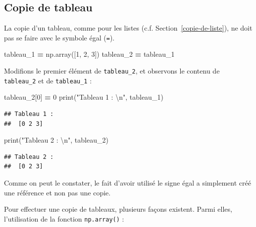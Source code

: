 \documentclass[12pt,]{book}
\newenvironment{Shaded}{\begin{snugshade}}{\end{snugshade}}
\newcommand{\DecValTok}[1]{\textcolor[rgb]{0.00,0.00,0.81}{#1}}
\newcommand{\CharTok}[1]{\textcolor[rgb]{0.31,0.60,0.02}{#1}}
\newcommand{\StringTok}[1]{\textcolor[rgb]{0.31,0.60,0.02}{#1}}
\newcommand{\OperatorTok}[1]{\textcolor[rgb]{0.81,0.36,0.00}{\textbf{#1}}}
\newcommand{\BuiltInTok}[1]{#1}
\newcommand{\NormalTok}[1]{#1}
\numberwithin{equation}{section}
\numberwithin{countremarque}{section}
\begin{document}
\subsection{Copie de tableau}\label{copie-de-tableau}

La copie d'un tableau, comme pour les listes (c.f.
Section~\ref{copie-de-liste}), ne doit pas se faire avec le symbole égal
(\texttt{=}).

\begin{Shaded}
\begin{Highlighting}[]
\NormalTok{tableau_1 }\OperatorTok{=}\NormalTok{ np.array([}\DecValTok{1}\NormalTok{, }\DecValTok{2}\NormalTok{, }\DecValTok{3}\NormalTok{])}
\NormalTok{tableau_2 }\OperatorTok{=}\NormalTok{ tableau_1}
\end{Highlighting}
\end{Shaded}

Modifions le premier élément de \texttt{tableau\_2}, et observons le
contenu de \texttt{tableau\_2} et de \texttt{tableau\_1} :

\begin{Shaded}
\begin{Highlighting}[]
\NormalTok{tableau_2[}\DecValTok{0}\NormalTok{] }\OperatorTok{=} \DecValTok{0}
\BuiltInTok{print}\NormalTok{(}\StringTok{"Tableau 1 : }\CharTok{\textbackslash{}n}\StringTok{"}\NormalTok{, tableau_1)}
\end{Highlighting}
\end{Shaded}

\begin{lstlisting}
## Tableau 1 : 
##  [0 2 3]
\end{lstlisting}

\begin{Shaded}
\begin{Highlighting}[]
\BuiltInTok{print}\NormalTok{(}\StringTok{"Tableau 2 : }\CharTok{\textbackslash{}n}\StringTok{"}\NormalTok{, tableau_2)}
\end{Highlighting}
\end{Shaded}

\begin{lstlisting}
## Tableau 2 : 
##  [0 2 3]
\end{lstlisting}

Comme on peut le constater, le fait d'avoir utilisé le signe égal a
simplement créé une référence et non pas une copie.

Pour effectuer une copie de tableaux, plusieurs façons existent. Parmi
elles, l'utilisation de la fonction \texttt{np.array()} :
\end{document}

